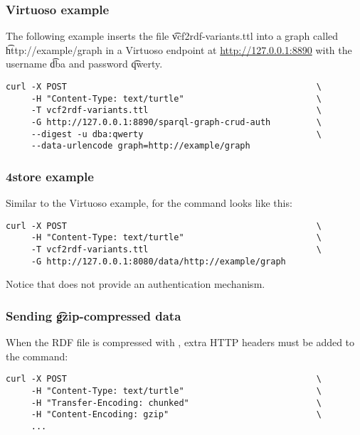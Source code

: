 \subsubsection{Virtuoso example}

\begin{sloppypar}
The following example inserts the file \t{vcf2rdf-variants.ttl} into
a graph called \t{http://example/graph} in a Virtuoso endpoint at
\url{http://127.0.0.1:8890} with the username \t{dba} and
password \t{qwerty}.
\end{sloppypar}

\begin{siderules}
\begin{verbatim}
curl -X POST                                                 \
     -H "Content-Type: text/turtle"                          \
     -T vcf2rdf-variants.ttl                                 \
     -G http://127.0.0.1:8890/sparql-graph-crud-auth         \
     --digest -u dba:qwerty                                  \
     --data-urlencode graph=http://example/graph
\end{verbatim}
\end{siderules}

\subsubsection{4store example}

Similar to the Virtuoso example, for  the command looks like
this:

\begin{siderules}
\begin{verbatim}
curl -X POST                                                 \
     -H "Content-Type: text/turtle"                          \
     -T vcf2rdf-variants.ttl                                 \
     -G http://127.0.0.1:8080/data/http://example/graph
\end{verbatim}
\end{siderules}

Notice that  does not provide an authentication mechanism.

\subsubsection{Sending \t{gzip}-compressed data}

  When the RDF file is compressed with \program{gzip}, extra HTTP headers must
  be added to the  command:
\begin{siderules}
\begin{verbatim}
curl -X POST                                                 \
     -H "Content-Type: text/turtle"                          \
     -H "Transfer-Encoding: chunked"                         \
     -H "Content-Encoding: gzip"                             \
     ...
\end{verbatim}
\end{siderules}
